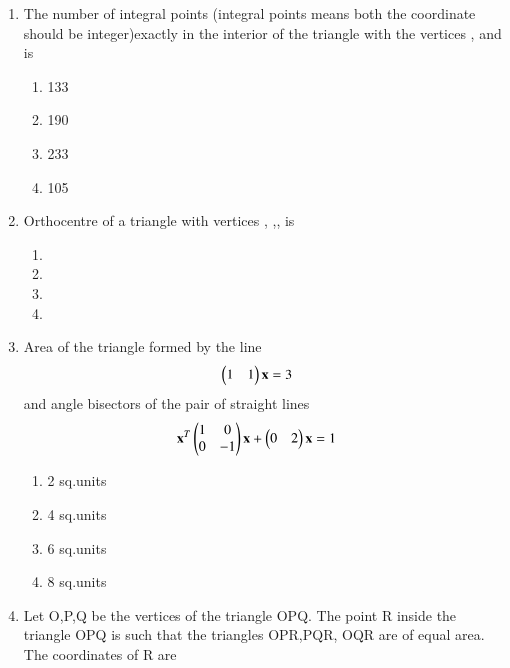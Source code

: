 \begin{enumerate}
    \item The number of integral points (integral points means both the coordinate should be integer)exactly in the interior of the triangle with the vertices  ,  and   is 
    \begin{enumerate}
     \item 133
     \item 190
     \item 233
     \item 105
     \end{enumerate}
    \item Orthocentre of a triangle with vertices  , ,, is
    \begin{enumerate}
     \item {}
     \item {}
     \item {}
     \item {}
     \end{enumerate}
    \item Area of the triangle formed by the line \begin{align} \begin{pmatrix}1 & 1\end{pmatrix} \mathbf {x} &= 3\end{align} and angle bisectors of the pair of straight lines \begin{align}\mathbf{x}^T \begin{pmatrix}1 & 0 \\ 0 & -1\end{pmatrix} \mathbf {x} + \begin{pmatrix}0 & 2\end{pmatrix} \mathbf {x} &= 1\end{align}
    \begin{enumerate}
     \item  2 sq.units
     \item  4 sq.units
     \item  6 sq.units
     \item  8 sq.units
     \end{enumerate}
    \item Let O,P,Q be the vertices of the triangle OPQ. The point R inside the triangle OPQ is such that the triangles OPR,PQR, OQR are of equal area. The coordinates of R are

\end{enumerate}
